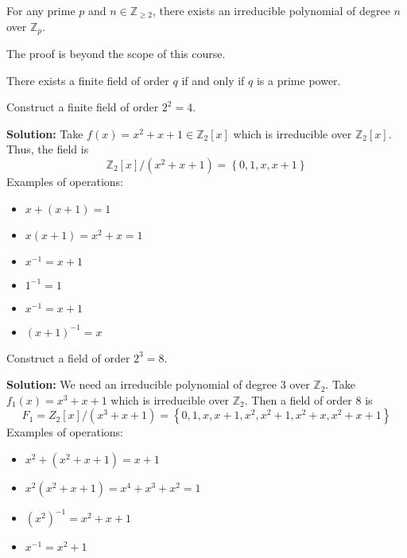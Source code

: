 \begin{thmbox}
    \begin{theorem}
        For any prime $ p $ and $ n\in\mathbb{Z}_{\geqslant 2} $, there exists
        an irreducible polynomial of degree $ n $ over $ \mathbb{Z}_p $.
    \end{theorem}
\end{thmbox}
The proof is beyond the scope of this course.

\begin{thmbox}
    \begin{theorem}
        There exists a finite field of order $ q $ if and only if
        $ q $ is a prime power.
    \end{theorem}
\end{thmbox}

\begin{exbox}
    \begin{example}
        Construct a finite field of order $ 2^2=4 $.

        \textbf{Solution:} Take $ f(x)=x^2+x+1\in\mathbb{Z}_2[x] $
        which is irreducible over $ \mathbb{Z}_2[x] $. Thus, the field is
        \[ \mathbb{Z}_2[x]/(x^2+x+1)=\left\{ 0,1,x,x+1\right\} \]
        Examples of operations:
        \begin{itemize}
            \item $ x+(x+1)=1 $
            \item $ x(x+1)=x^2+x=1 $
            \item $ x^{-1}=x+1 $
            \item $ 1^{-1}=1 $
            \item $ x^{-1}=x+1 $
            \item $ (x+1)^{-1}=x $
        \end{itemize}
    \end{example}
\end{exbox}

\begin{exbox}
    \begin{example}
        Construct a field of order $ 2^3=8 $.

        \textbf{Solution:} We need an irreducible polynomial of degree $ 3 $
        over $ \mathbb{Z}_2 $. Take $ f_1(x)=x^3+x+1 $ which is
        irreducible over $ \mathbb{Z}_2 $. Then a field of order $ 8 $ is
        \[ F_1=Z_2[x]/(x^3+x+1)=\left\{ 0,1,x,x+1,x^2,x^2+1,x^2+x,x^2+x+1\right\} \]
        Examples of operations:
        \begin{itemize}
            \item $ x^2+(x^2+x+1)=x+1 $
            \item $ x^2(x^2+x+1)=x^4+x^3+x^2=1 $
            \item $ (x^2)^{-1}=x^2+x+1 $
            \item $ x^{-1}=x^2+1 $
        \end{itemize}
    \end{example}
\end{exbox}

